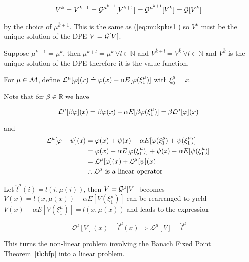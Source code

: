 \begin{equation*}
V^{\bar{k}} = V^{\bar{k}+1} = \mathcal{G}^{\mu^{\bar{k}+1}}[V^{\bar{k}+1}] = \mathcal{G}^{\mu^{\bar{k}+1}}[V^{\bar{k}}] = \mathcal{G}[V^{\bar{k}}]
\end{equation*}

by the choice of $\mu^{\bar{k}+1}$.
This is the same as (\ref{eq:mukplus1}) so $V^{\bar{k}}$ must be the unique solution of the DPE $V=\mathcal{G}[V]$.

\begin{theorem}%
\label{th:dpeuniquesol}
Suppose $\mu^{\bar{k}+1}=\mu^{\bar{k}}$, then $\mu^{\bar{k}+l}=\mu^{\bar{k}}~\forall l\in\mathbb{N}$ and $V^{\bar{k}+l}=V^{\bar{k}}~\forall l\in\mathbb{N}$ and $V^{\bar{k}}$ is the unique solution of the DPE therefore it is the value function.
\end{theorem}

\begin{definition}
For $\mu\in\mathcal{M}$, define $\mathcal{L}^\mu[\varphi](x)\doteq \varphi(x)-\alpha E[\varphi(\xi_1^\mu)]$ with $\xi_0^\mu=x$.
\end{definition}

Note that for $\beta\in\mathbb{R}$ we have

\begin{equation*}
\mathcal{L}^\mu[\beta\varphi](x) = \beta\varphi(x)-\alpha E[\beta\varphi(\xi_1^\mu)] = \beta\mathcal{L}^\mu[\varphi](x)
\end{equation*}

and
\begin{align*}
\mathcal{L}^\mu[\varphi+\psi](x) &= \varphi(x)+\psi(x) - \alpha E[\varphi(\xi_1^\mu)+\psi(\xi_1^\mu)] \\
&= \varphi(x)-\alpha E[\varphi(\xi_1^\mu)]+\psi(x)-\alpha E[\psi(\xi_1^\mu)] \\
&= \mathcal{L}^\mu[\varphi](x) + \mathcal{L}^\mu[\psi](x) \\
&\therefore \mathcal{L}^\mu \text{~is~a~linear~operator}
\end{align*}

Let $\hat{l}^\mu(i)\doteq l(i,\mu(i))$, then $V=\mathcal{G}^\mu[V]$ becomes $V(x)=l(x,\mu(x))+\alpha E[V(\xi_1^\mu)]$ can be rearranged to yield $V(x)-\alpha E[V(\xi_1^\mu)] = l(x,\mu(x))$ and leads to the expression

\begin{equation*}
\mathcal{L}^\mu[V](x) = \hat{l}^\mu(x) \Rightarrow \mathcal{L}^\mu[V] = \hat{l}^\mu
\end{equation*}

This turns the non-linear problem involving the Banach Fixed Point Theorem~\ref{th:bfp} into a linear problem.

